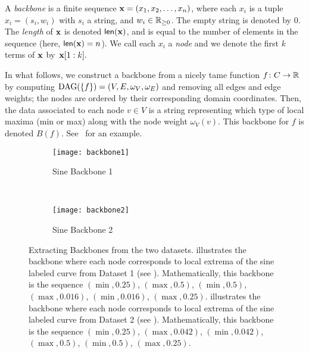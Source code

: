 \begin{defn}[Backbones] A \emph{backbone} is a finite sequence $\textbf{x} = (x_1, x_2,
    \dots , x_n)$, where each $x_i$ is a tuple~$x_i=(s_i, w_i)$ with $s_i$ a string, and $w_i \in
    \mathbb{R}_{\geq 0}$. The empty string is denoted by 0.
    The \emph{length} of $\textbf{x}$ is denoted $\operatorname{\textsf{len}}(\textbf{x})$, and is equal to the
    number of elements in the sequence (here, $\operatorname{\textsf{len}}(\textbf{x})=n$).
    We call each $x_i$ a
    \emph{node} and we denote the first $k$ terms of $\textbf{x}$ by~$\textbf{x}[1:k].$
\label{def:backbone}
\end{defn}

\begin{rem}
    In what follows, we construct a backbone from a nicely tame
    function $f \colon C \to \mathbb{R}$ by computing $\text{DAG}(\{
        f\})=(V,E,\omega_V,\omega_E)$ and removing all
    edges and edge weights; the nodes are ordered
    by their corresponding domain coordinates. Then, the data associated to each
    node $v \in V$ is a string representing which type of local maxima (min or
    max) along with the node weight $\omega_V(v)$.  This backbone for
    $f$ is denoted $B(f)$.
    See~ for an example.
\end{rem}

\begin{figure}[htp]
    \centering
    \begin{subfigure}[b]{\textwidth}
        \centering
        \texttt{[image: backbone1]}
        \caption{Sine Backbone 1}
        \label{fig:backbone1}
    \end{subfigure} \\
    \begin{subfigure}[b]{\textwidth}
        \centering
        \texttt{[image: backbone2]}
        \caption{Sine Backbone 2}
        \label{fig:backbone2}
    \end{subfigure}
    \caption{Extracting Backbones from the two datasets.
         illustrates the backbone where each node corresponds
        to local extrema of the sine labeled curve from Dataset 1 (see
        ). Mathematically, this backbone is the sequence
        $(\min, 0.25)$, $(\max, 0.5)$, $(\min, 0.5)$, $(\max, 0.016)$, $(\min, 0.016)$,
        $(\max, 0.25)$.   illustrates the backbone where each
        node corresponds to local extrema of the sine labeled curve from Dataset 2
         (see ). Mathematically, this backbone is
        the sequence $(\min, 0.25)$, $(\max, 0.042)$, $(\min, 0.042)$, $(\max, 0.5)$,
        $(\min, 0.5)$, $(\max, 0.25)$. }
        \label{fig:backbones}
\end{figure}

